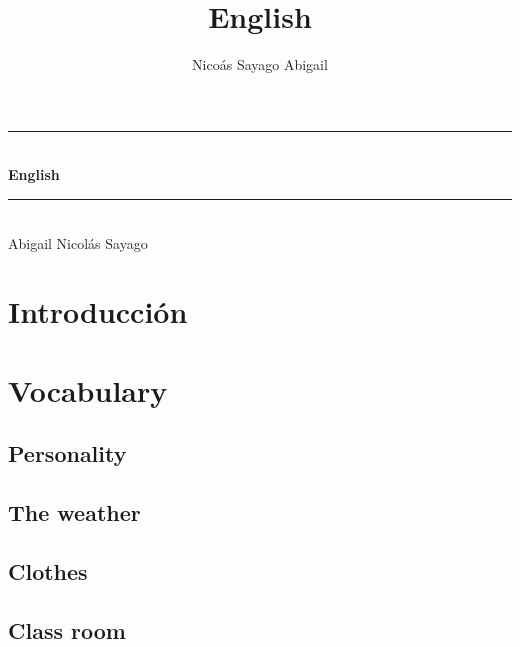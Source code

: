 \documentclass[12pt,openany]{book}
\title{English}
\author{Nico\'as Sayago Abigail}
\begin{document}
    \begin{titlepage}
        \centering
        \rule{\linewidth}{0.5mm} \\[1.0cm]
            { \huge \bfseries English}\\[1.0cm] 
        \rule{\linewidth}{0.5mm} \\[2.0cm]
        \centering
        Abigail Nicol\'as Sayago 
    \end{titlepage}
   
\tableofcontents


\chapter*{Introducci\'on}
 


\chapter{Vocabulary}

	\section{Personality}

	\section{The weather}
	
	\section{Clothes}

	\section{Class room}
\end{document}

